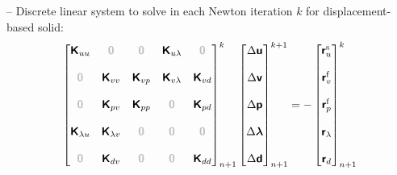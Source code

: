\documentclass[a4paper,12pt]{report}
\newcommand{\bs}[1]{\boldsymbol{#1}}
\newcommand{\zerom}{\textcolor{lightgray}{\bs{\mathsf{0}}}}
\newcommand{\ROP}{\bs{\mathsf{r}}}
\newcommand{\LM}{\bs{\mathsf{\lambda}}}
\newcommand{\lmi}{\lambda} %
\begin{document}
-- Discrete linear system to solve in each Newton iteration $k$ for displacement-based solid:
\begin{equation}
\label{equation-lin-sys-fsi}
\begin{aligned}
\begin{bmatrix} \boldsymbol{\mathsf{K}}_{uu} & \zerom & \zerom & \boldsymbol{\mathsf{K}}_{u\lmi} & \zerom \\ \\ \zerom & \boldsymbol{\mathsf{K}}_{vv} & \boldsymbol{\mathsf{K}}_{vp} & \boldsymbol{\mathsf{K}}_{v\lmi} & \boldsymbol{\mathsf{K}}_{vd} \\ \\ \zerom & \boldsymbol{\mathsf{K}}_{pv} & \boldsymbol{\mathsf{K}}_{pp} & \zerom & \boldsymbol{\mathsf{K}}_{pd} \\ \\ \boldsymbol{\mathsf{K}}_{\lmi u} & \boldsymbol{\mathsf{K}}_{\lmi v} & \zerom & \zerom & \zerom \\ \\ \zerom &  \boldsymbol{\mathsf{K}}_{dv}  & \zerom & \zerom & \boldsymbol{\mathsf{K}}_{dd} \end{bmatrix}_{n+1}^{k}\begin{bmatrix} \Delta\boldsymbol{\mathsf{u}} \\ \\ \Delta\boldsymbol{\mathsf{v}} \\ \\ \Delta\boldsymbol{\mathsf{p}} \\ \\ \Delta\LM \\ \\ \Delta\boldsymbol{\mathsf{d}} \end{bmatrix}_{n+1}^{k+1}=-\begin{bmatrix} \ROP_{u}^{\mathrm{s}} \\ \\ \ROP_{v}^{\mathrm{f}} \\ \\ \ROP_{p}^{\mathrm{f}} \\ \\ \ROP_{\lmi} \\ \\ \ROP_{d}\end{bmatrix}_{n+1}^{k}
\end{aligned}
\end{equation}
\end{document}
